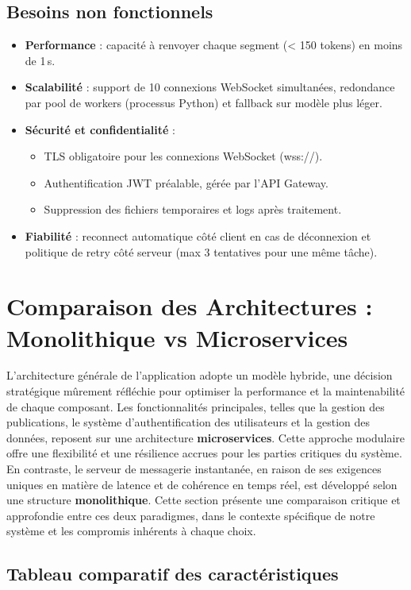 \documentclass[12pt]{rapportPfe}
\begin{document}
\subsection{Besoins non fonctionnels}
\begin{itemize}[itemsep=0.8em]
  \item \textbf{Performance} : capacité à renvoyer chaque segment (< 150 tokens) en moins de 1 s.
  \item \textbf{Scalabilité} : support de 10 connexions WebSocket simultanées, redondance par pool de workers (processus Python) et fallback sur modèle plus léger.
  \item \textbf{Sécurité et confidentialité} :
    \begin{itemize}
      \item TLS obligatoire pour les connexions WebSocket (wss://).
      \item Authentification JWT préalable, gérée par l’API Gateway.
      \item Suppression des fichiers temporaires et logs après traitement.
    \end{itemize}
  \item \textbf{Fiabilité} : reconnect automatique côté client en cas de déconnexion et politique de retry côté serveur (max 3 tentatives pour une même tâche).
\end{itemize}
\section{Comparaison des Architectures : Monolithique vs Microservices}

L'architecture générale de l'application adopte un modèle hybride, une décision stratégique mûrement réfléchie pour optimiser la performance et la maintenabilité de chaque composant. Les fonctionnalités principales, telles que la gestion des publications, le système d'authentification des utilisateurs et la gestion des données, reposent sur une architecture \textbf{microservices}. Cette approche modulaire offre une flexibilité et une résilience accrues pour les parties critiques du système. En contraste, le serveur de messagerie instantanée, en raison de ses exigences uniques en matière de latence et de cohérence en temps réel, est développé selon une structure \textbf{monolithique}. Cette section présente une comparaison critique et approfondie entre ces deux paradigmes, dans le contexte spécifique de notre système et les compromis inhérents à chaque choix.

\subsection{Tableau comparatif des caractéristiques}
\end{document}
